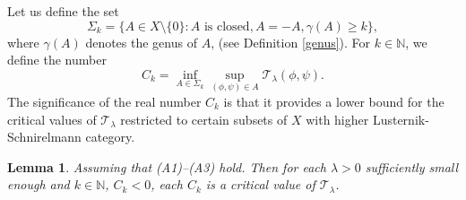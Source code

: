 \documentclass[10pt,a4paper]{amsart}
\numberwithin{equation}{section}
\newtheorem{lemma}[theo]{Lemma}
\begin{document}
Let us define the set
\begin{equation*}
\Sigma_k=\lbrace A\in X\setminus\lbrace 0\rbrace: A \text{ is closed}, 
A=-A, \gamma(A)\geq k\rbrace,
\end{equation*}
where $\gamma(A)$ denotes the genus of $A$, (see Definition \ref{genus}). 
For $k\in\mathbb{N}$, we define the number
\[
C_k=\inf_{A\in \Sigma_k}\sup_{(\phi,\psi)\in A}\mathcal{T}_\lambda(\phi,\psi).
\]
The significance of the real number $C_k$ is that it provides a lower bound for the 
critical values of $\mathcal{T}_\lambda$ restricted to certain subsets of $X$ with 
higher Lusternik-Schnirelmann category.

\begin{lemma}\label{L2}
Assuming that  {\rm (A1)--(A3)} hold. Then 
for each $\lambda>0$ sufficiently small enough and $k\in \mathbb{N}$, $C_k<0$,
 each $C_k$ is a critical value of $\mathcal{T}_\lambda$.
\end{lemma}
\end{document}
